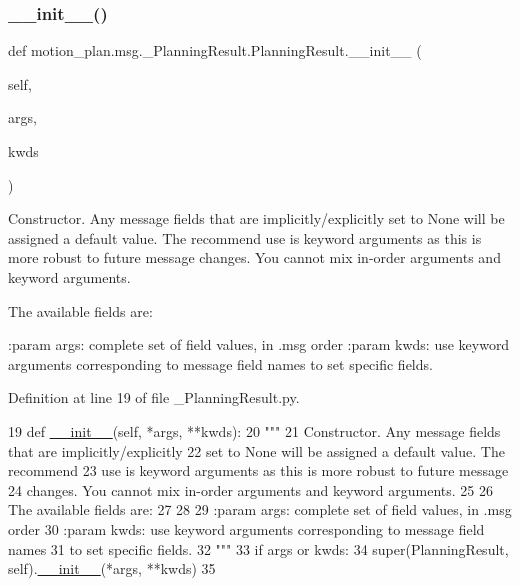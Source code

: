 \subsubsection{\texorpdfstring{\+\_\+\+\_\+init\+\_\+\+\_\+()}{\_\_init\_\_()}}
{\footnotesize\ttfamily def motion\+\_\+plan.\+msg.\+\_\+\+Planning\+Result.\+Planning\+Result.\+\_\+\+\_\+init\+\_\+\+\_\+ (\begin{DoxyParamCaption}\item[{}]{self,  }\item[{}]{args,  }\item[{}]{kwds }\end{DoxyParamCaption})}

\begin{DoxyVerb}Constructor. Any message fields that are implicitly/explicitly
set to None will be assigned a default value. The recommend
use is keyword arguments as this is more robust to future message
changes.  You cannot mix in-order arguments and keyword arguments.

The available fields are:
   

:param args: complete set of field values, in .msg order
:param kwds: use keyword arguments corresponding to message field names
to set specific fields.
\end{DoxyVerb}
 

Definition at line 19 of file \+\_\+\+Planning\+Result.\+py.


\begin{DoxyCode}
19   \textcolor{keyword}{def }\hyperlink{classstate__machine_1_1Play_a5993a23d8be7f7b2647f71ede0334957}{\_\_init\_\_}(self, *args, **kwds):
20     \textcolor{stringliteral}{"""}
21 \textcolor{stringliteral}{    Constructor. Any message fields that are implicitly/explicitly}
22 \textcolor{stringliteral}{    set to None will be assigned a default value. The recommend}
23 \textcolor{stringliteral}{    use is keyword arguments as this is more robust to future message}
24 \textcolor{stringliteral}{    changes.  You cannot mix in-order arguments and keyword arguments.}
25 \textcolor{stringliteral}{}
26 \textcolor{stringliteral}{    The available fields are:}
27 \textcolor{stringliteral}{       }
28 \textcolor{stringliteral}{}
29 \textcolor{stringliteral}{    :param args: complete set of field values, in .msg order}
30 \textcolor{stringliteral}{    :param kwds: use keyword arguments corresponding to message field names}
31 \textcolor{stringliteral}{    to set specific fields.}
32 \textcolor{stringliteral}{    """}
33     \textcolor{keywordflow}{if} args \textcolor{keywordflow}{or} kwds:
34       super(PlanningResult, self).\hyperlink{classstate__machine_1_1Play_a5993a23d8be7f7b2647f71ede0334957}{\_\_init\_\_}(*args, **kwds)
35 
\end{DoxyCode}


